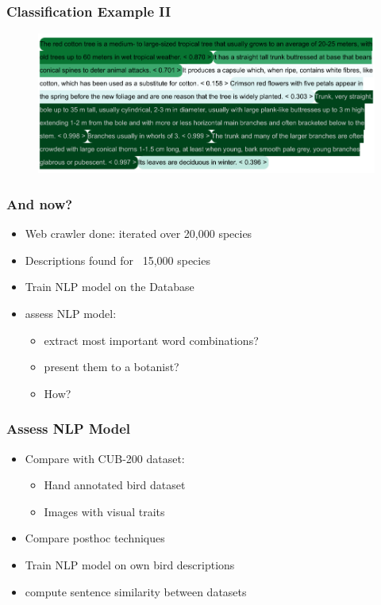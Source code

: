\documentclass{beamer}
\begin{document}
\begin{frame}
\frametitle{Classification Example II}
\begin{figure} [htbp]
    \centering
    \includegraphics[width=\textwidth]{figures/web_crawler_example_sents_preds_2.pdf}
\end{figure}
\end{frame}



\begin{frame}
\frametitle{And now?}
\begin{itemize}
    \item Web crawler done: iterated over 20,000 species
    \item Descriptions found for ~15,000 species
    \item Train NLP model on the Database
    \item assess NLP model:
    \begin{itemize}
         \item extract most important word combinations? 
         \item present them to a botanist?
         \item How?
    \end{itemize}
\end{itemize}
\end{frame}

\begin{frame}
\frametitle{Assess NLP Model}
\begin{itemize}
    \item Compare with CUB-200 dataset:
    \begin{itemize}
        \item Hand annotated bird dataset
        \item Images with visual traits
    \end{itemize}
    \item Compare posthoc techniques
    \item Train NLP model on own bird descriptions
    \item compute sentence similarity between datasets
\end{itemize}
\end{frame}
\end{document}
